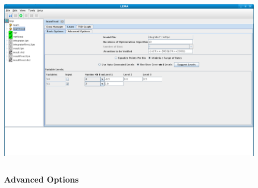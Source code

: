 \documentclass[titlepage,11pt]{article}
\begin{document}
\begin{center}
\includegraphics[height=85mm]{screenshots/learnBasicLema}
\end{center}

\subsubsection{\label{learnAdvOptions}Advanced Options}
\end{document}
